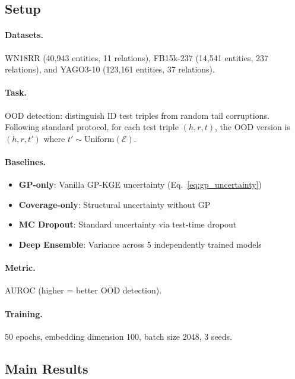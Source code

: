 
\subsection{Setup}

\paragraph{Datasets.}
WN18RR (40,943 entities, 11 relations), FB15k-237 (14,541 entities, 237 relations), and YAGO3-10 (123,161 entities, 37 relations).

\paragraph{Task.}
OOD detection: distinguish ID test triples from random tail corruptions.
Following standard protocol, for each test triple $(h, r, t)$, the OOD version is $(h, r, t')$ where $t' \sim \text{Uniform}(\mathcal{E})$.

\paragraph{Baselines.}
\begin{itemize}
    \item \textbf{GP-only}: Vanilla GP-KGE uncertainty (Eq.~\ref{eq:gp_uncertainty})
    \item \textbf{Coverage-only}: Structural uncertainty without GP
    \item \textbf{MC Dropout}: Standard uncertainty via test-time dropout
    \item \textbf{Deep Ensemble}: Variance across 5 independently trained models
\end{itemize}

\paragraph{Metric.} AUROC (higher = better OOD detection).

\paragraph{Training.} 50 epochs, embedding dimension 100, batch size 2048, 3 seeds.

\subsection{Main Results}

